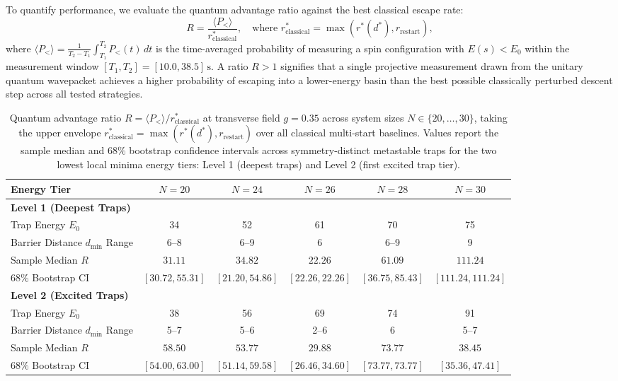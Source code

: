To quantify performance, we evaluate the quantum advantage ratio against the best classical escape rate:
\begin{equation}
R = \frac{\langle P_< \rangle}{r_{\text{classical}}^*}, \quad \text{where } r_{\text{classical}}^* = \max\left(r^*(d^*), r_{\text{restart}}\right),
\end{equation}
where $\langle P_< \rangle = \frac{1}{T_2 - T_1} \int_{T_1}^{T_2} P_<(t)\,dt$ is the time-averaged probability of measuring a spin configuration with $E(s) < E_0$ within the measurement window $[T_1, T_2] = [10.0, 38.5]\,\text{s}$. A ratio $R > 1$ signifies that a single projective measurement drawn from the unitary quantum wavepacket achieves a higher probability of escaping into a lower-energy basin than the best possible classically perturbed descent step across all tested strategies.

\begin{table}[t]
\centering
\small
\caption{Quantum advantage ratio $R = \langle P_< \rangle / r_{\text{classical}}^*$ at transverse field $g = 0.35$ across system sizes $N \in \{20, \dots, 30\}$, taking the upper envelope $r_{\text{classical}}^* = \max(r^*(d^*), r_{\text{restart}})$ over all classical multi-start baselines. Values report the sample median and $68\%$ bootstrap confidence intervals across symmetry-distinct metastable traps for the two lowest local minima energy tiers: Level 1 (deepest traps) and Level 2 (first excited trap tier).}
\label{tab:ratio_summary}
\begin{tabular}{lccccc}
\toprule
\textbf{Energy Tier} & $N = 20$ & $N = 24$ & $N = 26$ & $N = 28$ & $N = 30$ \\
\midrule
\textbf{Level 1 (Deepest Traps)} & & & & & \\
Trap Energy $E_0$ & 34 & 52 & 61 & 70 & 75 \\
Barrier Distance $d_{\min}$ Range & 6--8 & 6--9 & 6 & 6--9 & 9 \\
Sample Median $R$ & $\mathbf{31.11}$ & $\mathbf{34.82}$ & $\mathbf{22.26}$ & $\mathbf{61.09}$ & $\mathbf{111.24}$ \\
$68\%$ Bootstrap CI & $[30.72, 55.31]$ & $[21.20, 54.86]$ & $[22.26, 22.26]$ & $[36.75, 85.43]$ & $[111.24, 111.24]$ \\
\midrule
\textbf{Level 2 (Excited Traps)} & & & & & \\
Trap Energy $E_0$ & 38 & 56 & 69 & 74 & 91 \\
Barrier Distance $d_{\min}$ Range & 5--7 & 5--6 & 2--6 & 6 & 5--7 \\
Sample Median $R$ & $\mathbf{58.50}$ & $\mathbf{53.77}$ & $\mathbf{29.88}$ & $\mathbf{73.77}$ & $\mathbf{38.45}$ \\
$68\%$ Bootstrap CI & $[54.00, 63.00]$ & $[51.14, 59.58]$ & $[26.46, 34.60]$ & $[73.77, 73.77]$ & $[35.36, 47.41]$ \\
\bottomrule
\end{tabular}
\end{table}

